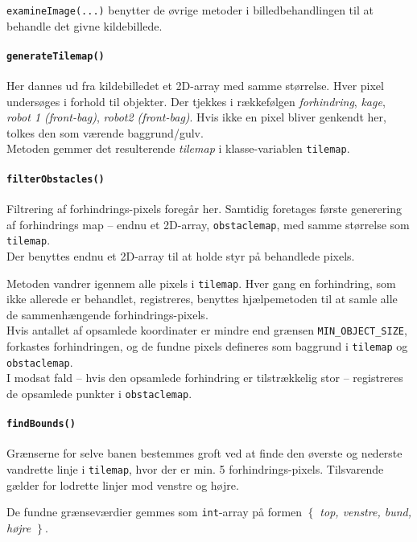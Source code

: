 \texttt{examineImage(...)} benytter de øvrige metoder i billedbehandlingen til at behandle det givne kildebillede.

\paragraph{\texttt{generateTilemap()}}
Her dannes ud fra kildebilledet et 2D-array med samme størrelse. Hver pixel undersøges i forhold til  objekter. Der tjekkes i rækkefølgen \textit{forhindring}, \textit{kage}, \textit{robot 1 (front-bag)}, \textit{robot2 (front-bag)}. Hvis ikke en pixel bliver genkendt her, tolkes den som værende baggrund/gulv.\\
Metoden gemmer det resulterende \textit{tilemap} i klasse-variablen \texttt{tilemap}.

\paragraph{\texttt{filterObstacles()}}
Filtrering af forhindrings-pixels foregår her. Samtidig foretages første generering af forhindrings map -- endnu et 2D-array, \texttt{obstaclemap}, med samme størrelse som \texttt{tilemap}.\\
Der benyttes endnu et 2D-array til at holde styr på behandlede pixels.

Metoden vandrer igennem alle pixels i \texttt{tilemap}. Hver gang en forhindring, som ikke allerede er behandlet, registreres, benyttes hjælpemetoden  til at samle alle de sammenhængende forhindrings-pixels.\\
Hvis antallet af opsamlede koordinater er mindre end grænsen \texttt{MIN\_OBJECT\_SIZE}, forkastes forhindringen, og de fundne pixels defineres som baggrund i \texttt{tilemap} og \texttt{obstaclemap}.\\
I modsat fald -- hvis den opsamlede forhindring er tilstrækkelig stor -- registreres de opsamlede punkter i \texttt{obstaclemap}.

\paragraph{\texttt{findBounds()}}
Grænserne for selve banen bestemmes groft ved at finde den øverste og nederste vandrette linje i \texttt{tilemap}, hvor der er min. 5 forhindrings-pixels. Tilsvarende gælder for lodrette linjer mod venstre og højre.

De fundne grænseværdier gemmes som \texttt{int}-array på formen \textit{$\left\{\right.$ top, venstre, bund, højre $\left.\right\}$}.

